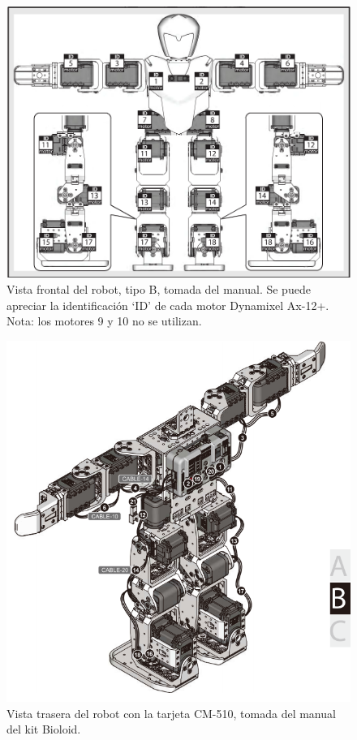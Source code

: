 \begin{figure}[hbtp]
\centering
\includegraphics[scale=0.3]{imagenes/Robot.png}
\caption{Vista frontal del robot, tipo B, tomada del manual. Se puede apreciar la identificación ‘ID’ de cada motor Dynamixel Ax-12+. Nota: los motores 9 y 10 no se utilizan.}
\label{fig:frontal}
\end{figure}

\begin{figure}[hbtp]
\centering
\includegraphics[scale=0.3]{imagenes/RobotTrasero.png}
\caption{Vista trasera del robot con la tarjeta CM-510, tomada del manual del kit Bioloid.}
\label{fig:trasera1}
\end{figure}


